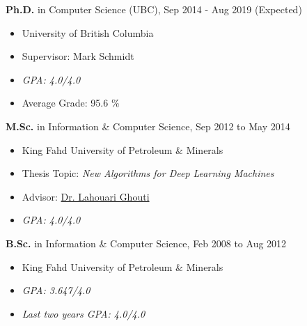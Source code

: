 \documentclass[10pt]{article}
\newenvironment{innerlist}[1][\enskip\textbullet]%
        {\begin{itemize}[#1,leftmargin=*,parsep=0pt,itemsep=0pt,topsep=0pt,partopsep=0pt]}
        {\end{itemize}}
\begin{document}
{\bf Ph.D.} in Computer Science (UBC),  \hfill Sep 2014 - Aug 2019 (Expected)
             
        \begin{innerlist}
        \item University of British Columbia
        \item Supervisor: {Mark Schmidt}
        \item \emph{GPA: 4.0/4.0}
        \item Average Grade: 95.6 \%\\
        \end{innerlist}
 {\bf M.Sc.} in Information \& Computer Science, \hfill {Sep 2012 to May 2014}
        
       \begin{innerlist}
        \item King Fahd University of Petroleum \& Minerals
        \item Thesis Topic: \emph{New Algorithms for Deep Learning Machines}
        \item Advisor:
              \href{http://faculty.kfupm.edu.sa/ICS/lahouari/Default.htm}
                   {Dr. Lahouari Ghouti}
        \item \emph{GPA: 4.0/4.0}\\
        \end{innerlist}

 {\bf B.Sc.} in Information \& Computer Science, \hfill {Feb 2008 to Aug 2012}
        \begin{innerlist}
        \item King Fahd University of Petroleum \& Minerals
        \item \emph{GPA: 3.647/4.0}
        \item \emph{Last two years GPA:  4.0/4.0}
        \end{innerlist}
\end{document}
